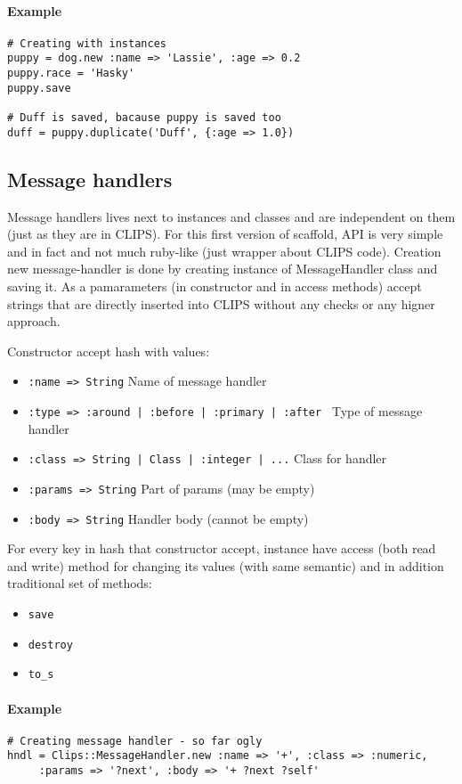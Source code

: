 \documentclass[a4paper,10pt]{article}
\begin{document}
\paragraph{Example}
\begin{verbatim}
# Creating with instances
puppy = dog.new :name => 'Lassie', :age => 0.2
puppy.race = 'Hasky'
puppy.save

# Duff is saved, bacause puppy is saved too
duff = puppy.duplicate('Duff', {:age => 1.0})
\end{verbatim}

\subsection{Message handlers}
Message handlers lives next to instances and classes and are independent on them (just as they are in CLIPS). For this first version of scaffold, API is very simple and in fact and not much ruby-like (just wrapper about CLIPS code). Creation new message-handler is done by creating instance of MessageHandler class and saving it. As a pamarameters (in constructor and in access methods) accept strings that are directly inserted into CLIPS without any checks or any higner approach.

Constructor accept hash with values:
\begin{itemize}
 \item \texttt{:name => String} Name of message handler
 \item \texttt{:type => :around | :before | :primary | :after } Type of message handler
 \item \texttt{:class => String | Class | :integer | ...} Class for handler
 \item \texttt{:params => String} Part of params (may be empty)
 \item \texttt{:body => String} Handler body (cannot be empty)
\end{itemize}

For every key in hash that constructor accept, instance have access (both read and write) method for changing its values (with same semantic) and in addition traditional set of methods:
\begin{itemize}
 \item \texttt{save}
 \item \texttt{destroy}
 \item \texttt{to\_s}
\end{itemize}

\paragraph{Example}
\begin{verbatim}
# Creating message handler - so far ogly
hndl = Clips::MessageHandler.new :name => '+', :class => :numeric,
	 :params => '?next', :body => '+ ?next ?self'
\end{verbatim}
\end{document}
